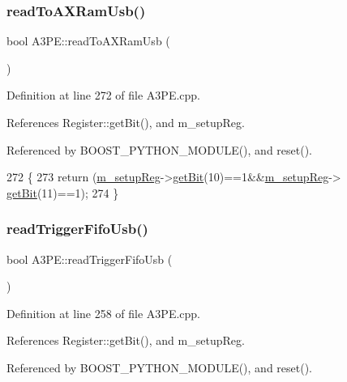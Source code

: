 \subsubsection{\texorpdfstring{read\+To\+A\+X\+Ram\+Usb()}{readToAXRamUsb()}}
{\footnotesize\ttfamily bool A3\+P\+E\+::read\+To\+A\+X\+Ram\+Usb (\begin{DoxyParamCaption}{ }\end{DoxyParamCaption})}



Definition at line 272 of file A3\+P\+E.\+cpp.



References Register\+::get\+Bit(), and m\+\_\+setup\+Reg.



Referenced by B\+O\+O\+S\+T\+\_\+\+P\+Y\+T\+H\+O\+N\+\_\+\+M\+O\+D\+U\+L\+E(), and reset().


\begin{DoxyCode}
272                          \{
273   \textcolor{keywordflow}{return} (\hyperlink{classA3PE_a142fa10b7e705c4701ae21678ec2ec8a}{m\_setupReg}->\hyperlink{classRegister_a5d27c9ff548817eee097ba4fdc8e8f69}{getBit}(10)==1&&\hyperlink{classA3PE_a142fa10b7e705c4701ae21678ec2ec8a}{m\_setupReg}->
      \hyperlink{classRegister_a5d27c9ff548817eee097ba4fdc8e8f69}{getBit}(11)==1);
274 \}
\end{DoxyCode}
\mbox{\label{classA3PE_a083315774486528a8b6c40e240fbf98f}} 
\subsubsection{\texorpdfstring{read\+Trigger\+Fifo\+Usb()}{readTriggerFifoUsb()}}
{\footnotesize\ttfamily bool A3\+P\+E\+::read\+Trigger\+Fifo\+Usb (\begin{DoxyParamCaption}{ }\end{DoxyParamCaption})}



Definition at line 258 of file A3\+P\+E.\+cpp.



References Register\+::get\+Bit(), and m\+\_\+setup\+Reg.



Referenced by B\+O\+O\+S\+T\+\_\+\+P\+Y\+T\+H\+O\+N\+\_\+\+M\+O\+D\+U\+L\+E(), and reset().


